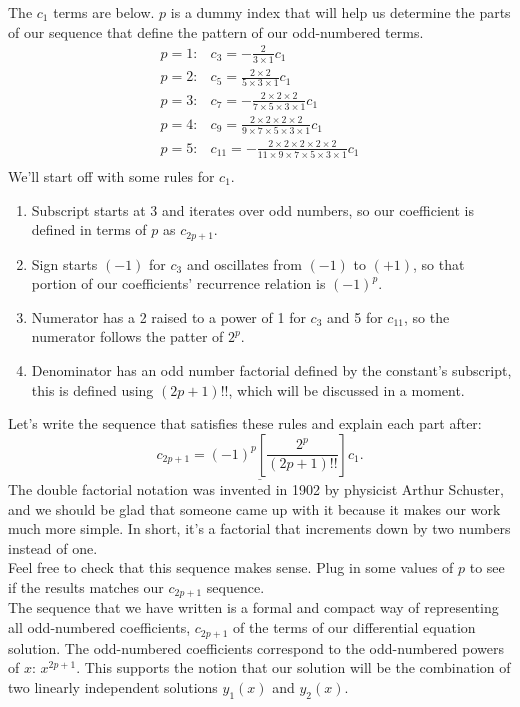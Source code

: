 \documentclass[a4paper,12pt]{article} %
\begin{document}
The $c_1$ terms are below. $p$ is a dummy index that will help us determine the parts of our sequence that define the pattern of our odd-numbered terms.
$$
\begin{array}{rl}
p=1 :& c_3 = -\frac{2}{3\times1}c_1\\
p=2 :& c_5 = \frac{2\times2}{5\times3\times1}c_1\\
p=3 :& c_7=-\frac{2\times2\times2}{7\times5\times3\times1}c_1\\
p=4 :& c_9 = \frac{2\times2\times2\times2}{9\times7\times5\times3\times1}c_1\\
p=5 :&  c_{11} = -\frac{2\times2\times2\times2\times2}{11\times9\times7\times5\times3\times1}c_1\\
\end{array}
$$
We'll start off with some rules for $c_1$.
\begin{enumerate}
	\item Subscript starts at 3 and iterates over odd numbers, so our coefficient is defined in terms of $p$ as $c_{2p+1}$.
	\item Sign starts $(-1)$ for $c_3$ and oscillates from $(-1)$ to $(+1)$, so that portion of our coefficients' recurrence relation is $(-1)^p$.
	\item Numerator has a 2 raised to a power of 1 for $c_3$ and 5 for $c_{11}$, so the numerator follows the patter of $2^p$.
	\item Denominator has an odd number factorial defined by the constant's subscript, this is defined using $(2p+1)!!$, which will be discussed in a moment.
\end{enumerate}
Let's write the sequence that satisfies these rules and explain each part after:
$$ \underline{c_{2p+1} = (-1)^{p}\left[\frac{2^{p}}{(2p+1)!!}\right]c_1.}$$
The double factorial notation was invented in 1902 by physicist Arthur Schuster, and we should be glad that someone came up with it because it makes our work much more simple. In short, it's a factorial that increments down by two numbers instead of one. \\

Feel free to check that this sequence makes sense. Plug in some values of $p$ to see if the results matches our $c_{2p+1}$ sequence.\\

The sequence that we have written is a formal and compact way of representing all odd-numbered coefficients, $c_{2p+1}$ of the terms of our differential equation solution. The odd-numbered coefficients correspond to the odd-numbered powers of $x$: $x^{2p+1}$. This supports the notion that our solution will be the combination of two linearly independent solutions $y_1(x)$ and $y_2(x)$.\\
\end{document}

